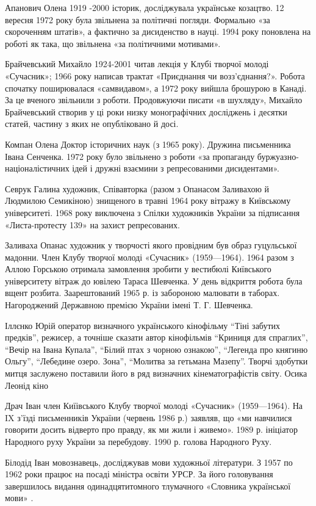 Апанович Олена 1919 -2000 історик, досліджувала українське козацтво. 12 вересня 1972 року була звільнена за політичні погляди. Формально «за скороченням штатів», а фактично за дисиденство в науці. 1994 року поновлена на роботі як така, що звільнена «за політичними мотивами».

Брайчевський Михайло 1924-2001 читав лекція у Клубі творчої молоді «Сучасник»; 1966 року написав трактат «Приєднання чи возз'єднання?». Робота спочатку поширювалася «самвидавом», а 1972 року вийшла брошурою в Канаді. За це вченого звільнили з роботи. Продовжуючи писати «в шухляду», Михайло Брайчевський створив у ці роки низку монографічних досліджень і десятки статей, частину з яких не опубліковано й досі.

Компан Олена Доктор історичних наук (з 1965 року). Дружина письменника Івана Сенченка. 1972 року було звільнено з роботи «за пропаганду буржуазно-націоналістичних ідей і дружні взаємини з репресованими дисидентами».

Севрук Галина художник, Співавторка (разом з Опанасом Заливахою й Людмилою Семикіною) знищеного в травні 1964 року вітражу в Київському університеті. 1968 року виключена з Спілки художників України за підписання «Листа-протесту 139» на захист репресованих.

Заливаха Опанас художник у творчості якого провідним був образ гуцульської мадонни. Член Клубу творчої молоді «Сучасник» (1959—1964). 1964 разом з Аллою Горською отримала замовлення зробити у вестибюлі Київського університету вітраж до ювілею Тараса Шевченка. У день відкриття робота була вщент розбита. Заарештований 1965 р. із забороною малювати в таборах. Нагороджений Державною премією України імені Т. Г. Шевченка.

Іллєнко Юрій оператор визначного українського кінофільму “Тіні забутих предків”, режисер, а точніше сказати автор кінофільмів “Криниця для спраглих”, “Вечір на Івана Купала”, “Білий птах з чорною ознакою”, “Легенда про княгиню Ольгу”, “Лебедине озеро. Зона”, “Молитва за гетьмана Мазепу”. Творчі здобутки митця заслужено поставили його в ряд визначних кінематографістів світу. Осика Леонід кіно

Драч Іван член Киїівського Клубу творчої молоді «Сучасник» (1959—1964). На IX з'їзді письменників України (червень 1986 р.) заявляв, що «ми навчилися говорити досить відверто про правду, як ми жили і живемо». 1989 р. ініціатор Народного руху України за перебудову. 1990 р. голова Народного Руху.

Білодід Іван мовознавець, досліджував мови художньої літератури. З 1957 по 1962 роки працює на посаді міністра освіти УРСР. За його головування завершилось видання одинадцятитомного тлумачного «Словника української мови» .

